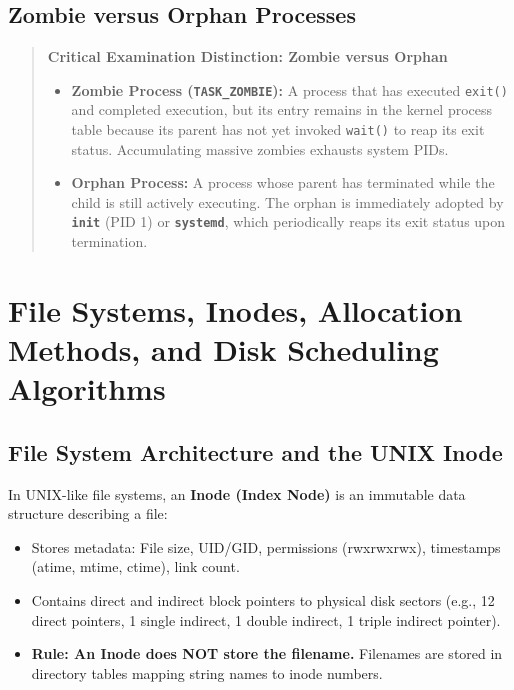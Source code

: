 \subsection{Zombie versus Orphan Processes}
\begin{quote}
\textbf{Critical Examination Distinction: Zombie versus Orphan}
\begin{itemize}
    \item \textbf{Zombie Process (\texttt{TASK\_ZOMBIE}):} A process that has executed \texttt{exit()} and completed execution, but its entry remains in the kernel process table because its parent has not yet invoked \texttt{wait()} to reap its exit status. Accumulating massive zombies exhausts system PIDs.
    \item \textbf{Orphan Process:} A process whose parent has terminated while the child is still actively executing. The orphan is immediately adopted by \textbf{\texttt{init}} (PID 1) or \textbf{\texttt{systemd}}, which periodically reaps its exit status upon termination.
\end{itemize}
\end{quote}

\section{File Systems, Inodes, Allocation Methods, and Disk Scheduling Algorithms}
\label{sec:os_file_systems_disk}

\subsection{File System Architecture and the UNIX Inode}
In UNIX-like file systems, an \textbf{Inode (Index Node)} is an immutable data structure describing a file:
\begin{itemize}
    \item Stores metadata: File size, UID/GID, permissions (rwxrwxrwx), timestamps (atime, mtime, ctime), link count.
    \item Contains direct and indirect block pointers to physical disk sectors (e.g., 12 direct pointers, 1 single indirect, 1 double indirect, 1 triple indirect pointer).
    \item \textbf{Rule: An Inode does NOT store the filename.} Filenames are stored in directory tables mapping string names to inode numbers.
\end{itemize}

